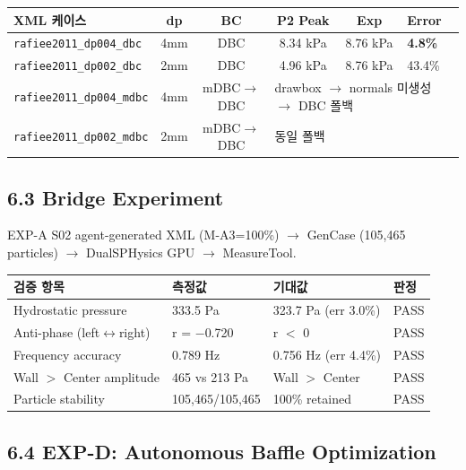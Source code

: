 \documentclass[10pt,a4paper]{article}
\begin{document}
\begin{center}
\small
\begin{tabular}{lccccl}
\toprule
\textbf{XML 케이스} & \textbf{dp} & \textbf{BC} & \textbf{P2 Peak} & \textbf{Exp} & \textbf{Error} \\
\midrule
\texttt{rafiee2011\_dp004\_dbc} & 4mm & DBC & 8.34 kPa & 8.76 kPa & \textbf{4.8\%} \\
\texttt{rafiee2011\_dp002\_dbc} & 2mm & DBC & 4.96 kPa & 8.76 kPa & 43.4\% \\
\texttt{rafiee2011\_dp004\_mdbc} & 4mm & mDBC$\rightarrow$DBC & \multicolumn{3}{l}{drawbox $\rightarrow$ normals 미생성 $\rightarrow$ DBC 폴백} \\
\texttt{rafiee2011\_dp002\_mdbc} & 2mm & mDBC$\rightarrow$DBC & \multicolumn{3}{l}{동일 폴백} \\
\bottomrule
\end{tabular}
\end{center}

\subsection{6.3 Bridge Experiment}

EXP-A S02 agent-generated XML (M-A3=100\%) $\rightarrow$ GenCase (105,465 particles) $\rightarrow$ DualSPHysics GPU $\rightarrow$ MeasureTool.

\begin{center}
\small
\begin{tabular}{llll}
\toprule
\textbf{검증 항목} & \textbf{측정값} & \textbf{기대값} & \textbf{판정} \\
\midrule
Hydrostatic pressure & 333.5 Pa & 323.7 Pa (err 3.0\%) & \textcolor{pass}{PASS} \\
Anti-phase (left$\leftrightarrow$right) & r = $-$0.720 & r $<$ 0 & \textcolor{pass}{PASS} \\
Frequency accuracy & 0.789 Hz & 0.756 Hz (err 4.4\%) & \textcolor{pass}{PASS} \\
Wall $>$ Center amplitude & 465 vs 213 Pa & Wall $>$ Center & \textcolor{pass}{PASS} \\
Particle stability & 105,465/105,465 & 100\% retained & \textcolor{pass}{PASS} \\
\bottomrule
\end{tabular}
\end{center}

\subsection{6.4 EXP-D: Autonomous Baffle Optimization}
\end{document}
